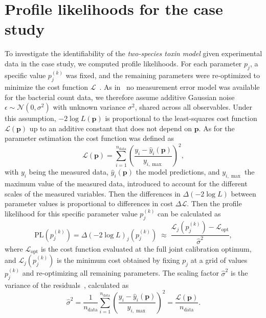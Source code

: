 \documentclass[10pt,1p,authoryear]{elsarticle}
\numberwithin{equation}{section}
\begin{document}
\section{Profile likelihoods for the case study}
\label{sec:supplement-case-study-profile-likelihoods}
To investigate the identifiability of the \textit{two-species toxin model} given experimental data in the case study, we computed profile likelihoods.
For each parameter $p_j$, a specific value $p_j^{(k)}$ was fixed, and the remaining parameters were re-optimized to minimize the cost function $\mathcal{L}$~\citep{kreutz_profile_2013}.
As in~\citet{ferrer-bustinsAntilisterialEffect2024} no measurement error model was available for the bacterial count data, we therefore assume additive Gaussian noise $\epsilon \sim \mathcal{N}(0, \sigma^2)$ with unknown variance $\sigma^2$, shared across all observables.
Under this assumption, $-2\log L(\mathbf{p})$ is proportional to the least-squares cost function $\mathcal{L}(\mathbf{p})$ up to an additive constant that does not depend on $\mathbf{p}$.
As for the parameter estimation the cost function was defined as
\begin{equation}
    \mathcal{L}(\mathbf{p}) = \sum_{i=1}^{n_{\text{data}}} \left(\frac{y_i - \hat y_i(\mathbf{p})}{y_{i,\max}}\right)^2,
\end{equation}
with $y_i$ being the measured data, $\hat y_i(\mathbf{p})$ the model predictions, and $y_{i,\max}$ the maximum value of the measured data, introduced to account for the different scales of the measured variables.
Then the differences in $\Delta(-2\log L)$ between parameter values is proportional to differences in cost $\Delta\mathcal{L}$.
Then the profile likelihood for this specific parameter value $p_j^{(k)}$ can be calculated as
\begin{equation}
    \text{PL}(p_j^{(k)}) = \Delta\!\left(-2\log L\right)_j\!\left(p_j^{(k)}\right) \;\approx\; \frac{\mathcal{L}_j\!\left(p_j^{(k)}\right) - \mathcal{L}_\text{opt}}{\hat\sigma^2},
\end{equation}
where $\mathcal{L}_\text{opt}$ is the cost function evaluated at the full joint calibration optimum, and $\mathcal{L}_j(p_j^{(k)})$ is the minimum cost obtained by fixing $p_j$ at a grid of values $p_j^{(k)}$ and re-optimizing all remaining parameters.
The scaling factor $\hat\sigma^2$ is the variance of the residuals~\citep{murphy_implementing_2023, simpson_profile-wise_2023}, calculated as
\begin{equation}
    \hat\sigma^2 = \frac{1}{n_{\text{data}}}\sum_{i=1}^{n_{\text{data}}} \left(\frac{y_i - \hat y_i(\mathbf{p})}{y_{i,\max}}\right)^2 = \frac{\mathcal{L}(\mathbf{p})}{n_{\text{data}}}.
\label{eq:sigma_mle_normalized2}
\end{equation}
\end{document}
